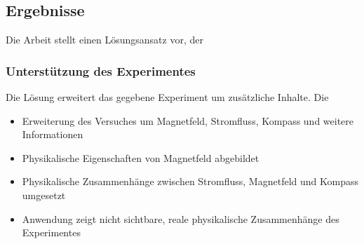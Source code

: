 \subsection{Ergebnisse}
Die Arbeit stellt einen Lösungsansatz vor, der 

\subsubsection{Unterstützung des Experimentes}
Die Lösung erweitert das gegebene Experiment um zusätzliche Inhalte. Die
\begin{itemize}
	\item Erweiterung des Versuches um Magnetfeld, Stromfluss, Kompass und weitere Informationen
	\item Physikalische Eigenschaften von Magnetfeld abgebildet
	\item Physikalische Zusammenhänge zwischen Stromfluss, Magnetfeld und Kompass umgesetzt
	\item Anwendung zeigt nicht sichtbare, reale physikalische Zusammenhänge des Experimentes
\end{itemize}

